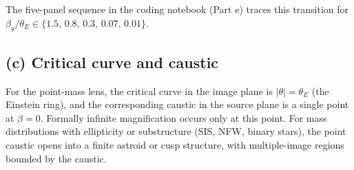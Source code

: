 \documentclass[11pt, a4paper]{article}
\newcommand{\thetaE}{\theta_{\!E}}
\begin{document}
The five-panel sequence in the coding notebook (Part e) traces this transition for
$\beta_y/\thetaE \in \{1.5,\,0.8,\,0.3,\,0.07,\,0.01\}$.

\subsection*{(c) Critical curve and caustic}

For the point-mass lens, the critical curve in the image plane is $|\theta| = \thetaE$
(the Einstein ring), and the corresponding caustic in the source plane is a single
point at $\beta = 0$.  Formally infinite magnification occurs only at this point.
For mass distributions with ellipticity or substructure (SIS, NFW, binary stars),
the point caustic opens into a finite astroid or cusp structure, with multiple-image
regions bounded by the caustic.
\end{document}
